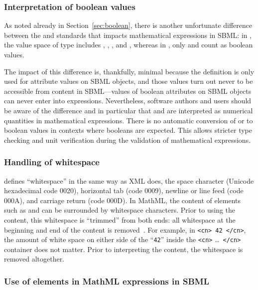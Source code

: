 \subsubsection{Interpretation of boolean values}
\label{sec:handling-booleans}

As noted already in Section~\ref{sec:boolean}, there is another
unfortunate difference between the \xmlschemaone and \mathmltwo
standards that impacts mathematical expressions in SBML: in
\xmlschema, the value space of type  includes
, , , and , whereas in
\mathml, only  and  count as boolean
values.

The impact of this difference is, thankfully, minimal because the
\xmlschema definition is only used for attribute values on SBML
objects, and those values turn out never to be accessible from
\mathml content in SBML---values of boolean attributes on SBML objects
can never enter into \mathml expressions.  Nevertheless, software
authors and users should be aware of the difference and in
particular that  and  are interpreted as numerical
quantities in mathematical expressions.  There is no automatic
conversion of  or  to boolean values in contexts
where booleans are expected.  This allows stricter type checking
and unit verification during the validation of mathematical
expressions.


\subsubsection{Handling of whitespace}
\label{sec:mathml-whitespace}

\mathmltwo defines ``whitespace'' in the same way as XML does, \ie
the space character (Unicode hexadecimal code 0020), horizontal
tab (code 0009), newline or line feed (code 000A), and carriage
return (code 000D).  In MathML, the content of elements such as
 and  can be surrounded by whitespace
characters.  Prior to using the content, this whitespace is
``trimmed'' from both ends: all whitespace at the beginning and
end of the content is removed~\citep{ausbrooks:2003}.  For
example, in \texttt{<cn> 42 </cn>}, the amount of white space on
either side of the ``\texttt{42}'' inside the \texttt{<cn>}
\ldots\ \texttt{</cn>} container does not matter.  Prior to
interpreting the content, the whitespace is removed altogether.


\subsubsection{Use of  elements in MathML expressions in SBML}
\label{sec:csymbol-token}
\label{sec:csymbol}

